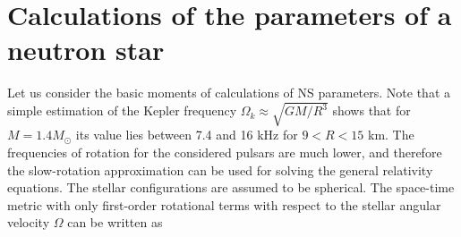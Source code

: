\documentclass[fleqn,usenatbib]{mnras}
\begin{document}








\appendix

\section{Calculations of the parameters of a neutron star}
\label{sect:eos_calc}
Let us consider the basic moments of calculations of NS parameters. Note that a simple estimation of the Kepler frequency
$\Omega_{k}\approx \sqrt{GM/R^3}$ shows that for $M=1.4M_{\odot}$ its value lies between
7.4 and 16 kHz for $9<R<15$ km. The frequencies of rotation
for the considered pulsars are much lower, and therefore the slow-rotation approximation can be used for solving the general relativity
equations. The stellar configurations are assumed to be spherical.
The space-time metric with only first-order rotational terms with
respect to the stellar angular velocity ${\Omega}$ can be written as
\end{document}
